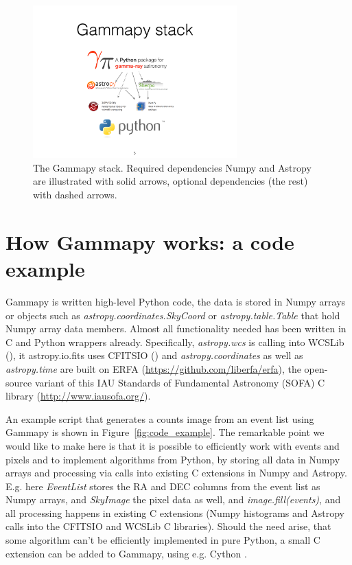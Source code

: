 \documentclass{PoS}
\newcommand{\url}[1]{\href{#1}{#1}}
\begin{document}
\begin{figure}[t]
\centering
\includegraphics[width=0.7\textwidth]{figures/gammapy-stack}
\caption{
The Gammapy stack. Required dependencies Numpy and Astropy are illustrated with solid arrows, optional dependencies (the rest) with dashed arrows.
}
\label{fig:stack}
\end{figure}

\section{How Gammapy works: a code example}
\label{sec:code}

Gammapy is written high-level Python code, the data is stored in Numpy arrays or
objects such as {\it astropy.coordinates.SkyCoord} or {\it astropy.table.Table}
that hold Numpy array data members. Almost all functionality needed has been
written in C and Python wrappers already. Specifically, {\it astropy.wcs} is
calling into WCSLib (\cite{wcslib}), {it astropy.io.fits} uses CFITSIO
(\cite{cfitsio}) and {\it astropy.coordinates} as well as {\it astropy.time} are
built on ERFA (\url{https://github.com/liberfa/erfa}), the open-source variant
of this IAU Standards of Fundamental Astronomy (SOFA) C library
(\url{http://www.iausofa.org/}).

An example script that generates a counts image from an event list using Gammapy
is shown in Figure~\ref{fig:code_example}. The remarkable point we would like to
make here is that it is possible to efficiently work with events and pixels and
to implement algorithms from Python, by storing all data in Numpy arrays and
processing via calls into existing C extensions in Numpy and Astropy. E.g. here
{\it EventList} stores the RA and DEC columns from the event list as Numpy
arrays, and {\it SkyImage} the pixel data as well, and {\it image.fill(events)},
and all processing happens in existing C extensions (Numpy histograms and
Astropy calls into the CFITSIO and WCSLib C libraries). Should the need arise,
that some algorithm can't be efficiently implemented in pure Python, a small C
extension can be added to Gammapy, using e.g. Cython \cite{cython}.
\end{document}
